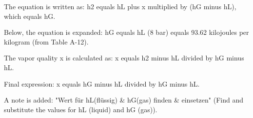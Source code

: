 The equation is written as:  
h2 equals hL plus x multiplied by (hG minus hL), which equals hG.  

Below, the equation is expanded:  
hG equals hL (8 bar) equals 93.62 kilojoules per kilogram (from Table A-12).  

The vapor quality x is calculated as:  
x equals h2 minus hL divided by hG minus hL.  

Final expression:  
x equals hG minus hL divided by hG minus hL.  

A note is added:  
"Wert für hL(flüssig) & hG(gas) finden & einsetzen" (Find and substitute the values for hL (liquid) and hG (gas)).